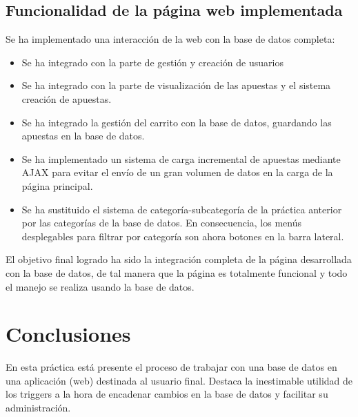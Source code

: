\documentclass{article}
\begin{document}
\subsection{Funcionalidad de la página web implementada}

Se ha implementado una interacción de la web con la base de datos completa:
\begin{itemize}
\item Se ha integrado con la parte de gestión y creación de usuarios
\item Se ha integrado con la parte de visualización de las apuestas y el sistema creación de apuestas.
\item Se ha integrado la gestión del carrito con la base de datos, guardando las apuestas en la base de datos.
\item Se ha implementado un sistema de carga incremental de apuestas mediante AJAX para evitar el envío de un gran volumen de datos en la carga de la página principal.
\item Se ha sustituido el sistema de categoría-subcategoría de la práctica anterior por las categorías de la base de datos. En consecuencia, los menús desplegables para filtrar por categoría son ahora botones en la barra lateral.
\end{itemize}

El objetivo final logrado ha sido la integración completa de la página desarrollada con la base de datos, de tal manera que la página es totalmente funcional y todo el manejo se realiza usando la base de datos.

\section{Conclusiones}
En esta práctica está presente el proceso de trabajar con una base de datos en una aplicación (web) destinada al usuario final. Destaca la inestimable utilidad de los triggers a la hora de encadenar cambios en la base de datos y facilitar su administración.
\end{document}

